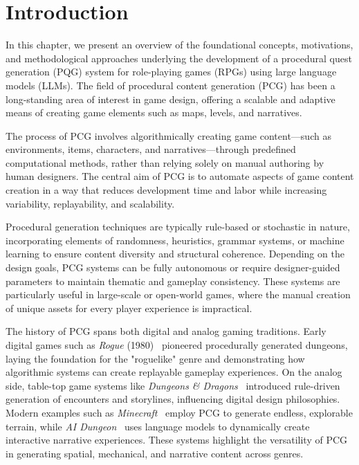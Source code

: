 \clearpage

\chapter{Introduction}

In this chapter, we present an overview of the foundational concepts, motivations, and
methodological approaches underlying the development of a procedural quest generation
(PQG) system for role-playing games (RPGs) using large language models (LLMs). The
field of procedural content generation (PCG) has been a long-standing area of interest in
game design, offering a scalable and adaptive means of creating game elements such as
maps, levels, and narratives.

The process of PCG involves algorithmically creating game content—such as environments,
items, characters, and narratives—through predefined computational methods,
rather than relying solely on manual authoring by human designers. The central aim of
PCG is to automate aspects of game content creation in a way that reduces development
time and labor while increasing variability, replayability, and scalability.

Procedural generation techniques are typically rule-based or stochastic in nature, incorporating
elements of randomness, heuristics, grammar systems, or machine learning to
ensure content diversity and structural coherence. Depending on the design goals, PCG
systems can be fully autonomous or require designer-guided parameters to maintain thematic
and gameplay consistency. These systems are particularly useful in large-scale or
open-world games, where the manual creation of unique assets for every player experience
is impractical.

The history of PCG spans both digital and analog gaming traditions. Early digital
games such as \textit{Rogue} (1980)~\cite{rogue1980} pioneered procedurally generated dungeons, laying the
foundation for the "roguelike" genre and demonstrating how algorithmic systems can create
replayable gameplay experiences. On the analog side, table-top game systems like
\textit{Dungeons \& Dragons}~\cite{dungeonsanddragons} introduced rule-driven generation of encounters and storylines,
influencing digital design philosophies. Modern examples such as \textit{Minecraft}~\cite{minecraft} employ
PCG to generate endless, explorable terrain, while \textit{AI Dungeon}~\cite{ai-dungeon} uses language models
to dynamically create interactive narrative experiences. These systems highlight the
versatility of PCG in generating spatial, mechanical, and narrative content across genres.

